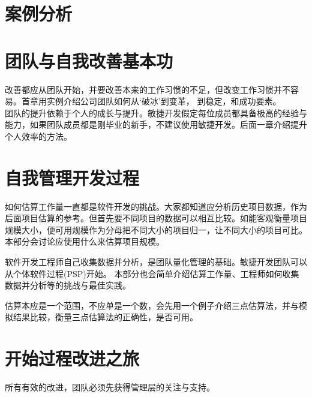 \documentclass{book}        %
\begin{document}
\part{案例分析}



\part{团队与自我改善基本功}改善都应从团队开始，并要改善本来的工作习惯的不足，但改变工作习惯并不容易。首章用实例介绍公司团队如何从‘破冰’到变革， 到稳定，和成功要素。 \\
团队的提升依赖于个人的成长与提升。敏捷开发假定每位成员都具备极高的经验与能力，如果团队成员都是刚毕业的新手，不建议使用敏捷开发。后面一章介绍提升个人效率的方法。\\




\part{自我管理开发过程}如何估算工作量一直都是软件开发的挑战。大家都知道应分析历史项目数据，作为后面项目估算的参考。但首先要不同项目的数据可以相互比较。如能客观衡量项目规模大小，便可用规模作为分母把不同大小的项目归一，让不同大小的项目可比。本部分会讨论应使用什么来估算项目规模。

软件开发工程师自己收集数据并分析，是团队量化管理的基础。敏捷开发团队可以从个体软件过程(PSP)开始。 本部分也会简单介绍估算工作量、工程师如何收集数据并分析等的挑战与最佳实践。

估算本应是一个范围，不应单是一个数，会先用一个例子介绍三点估算法，并与模拟结果比较，衡量三点估算法的正确性，是否可用。 \\
















\part{开始过程改进之旅}所有有效的改进，团队必须先获得管理层的关注与支持。
\end{document}
